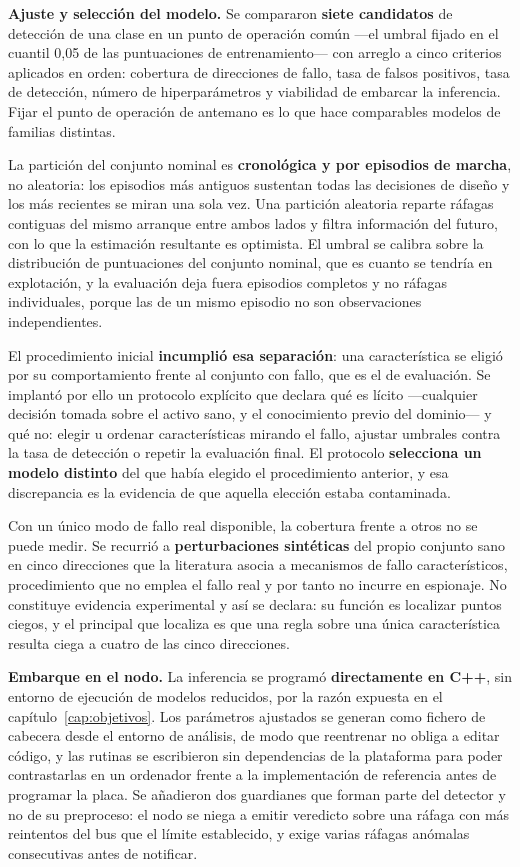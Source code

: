 \textbf{Ajuste y selección del modelo.} Se compararon \textbf{siete candidatos} de detección de una
clase en un punto de operación común —el umbral fijado en el cuantil 0,05 de las puntuaciones de
entrenamiento— con arreglo a cinco criterios aplicados en orden: cobertura de direcciones de fallo,
tasa de falsos positivos, tasa de detección, número de hiperparámetros y viabilidad de embarcar la
inferencia. Fijar el punto de operación de antemano es lo que hace comparables modelos de familias
distintas.

La partición del conjunto nominal es \textbf{cronológica y por episodios de marcha}, no aleatoria:
los episodios más antiguos sustentan todas las decisiones de diseño y los más recientes se miran
una sola vez. Una partición aleatoria reparte ráfagas contiguas del mismo arranque entre ambos
lados y filtra información del futuro, con lo que la estimación resultante es optimista. El umbral
se calibra sobre la distribución de puntuaciones del conjunto nominal, que es cuanto se tendría en
explotación, y la evaluación deja fuera episodios completos y no ráfagas individuales, porque las
de un mismo episodio no son observaciones independientes.

El procedimiento inicial \textbf{incumplió esa separación}: una característica se eligió por su
comportamiento frente al conjunto con fallo, que es el de evaluación. Se implantó por ello un
protocolo explícito que declara qué es lícito —cualquier decisión tomada sobre el activo sano, y el
conocimiento previo del dominio— y qué no: elegir u ordenar características mirando el fallo,
ajustar umbrales contra la tasa de detección o repetir la evaluación final. El protocolo
\textbf{selecciona un modelo distinto} del que había elegido el procedimiento anterior, y esa
discrepancia es la evidencia de que aquella elección estaba contaminada.

Con un único modo de fallo real disponible, la cobertura frente a otros no se puede medir. Se
recurrió a \textbf{perturbaciones sintéticas} del propio conjunto sano en cinco direcciones que la
literatura asocia a mecanismos de fallo característicos, procedimiento que no emplea el fallo real
y por tanto no incurre en espionaje. No constituye evidencia experimental y así se declara: su
función es localizar puntos ciegos, y el principal que localiza es que una regla sobre una única
característica resulta ciega a cuatro de las cinco direcciones.

\textbf{Embarque en el nodo.} La inferencia se programó \textbf{directamente en C++}, sin entorno
de ejecución de modelos reducidos, por la razón expuesta en el capítulo~\ref{cap:objetivos}. Los
parámetros ajustados se generan como fichero de cabecera desde el entorno de análisis, de modo que
reentrenar no obliga a editar código, y las rutinas se escribieron sin dependencias de la
plataforma para poder contrastarlas en un ordenador frente a la implementación de referencia antes
de programar la placa. Se añadieron dos guardianes que forman parte del detector y no de su
preproceso: el nodo se niega a emitir veredicto sobre una ráfaga con más reintentos del bus que el
límite establecido, y exige varias ráfagas anómalas consecutivas antes de notificar.

